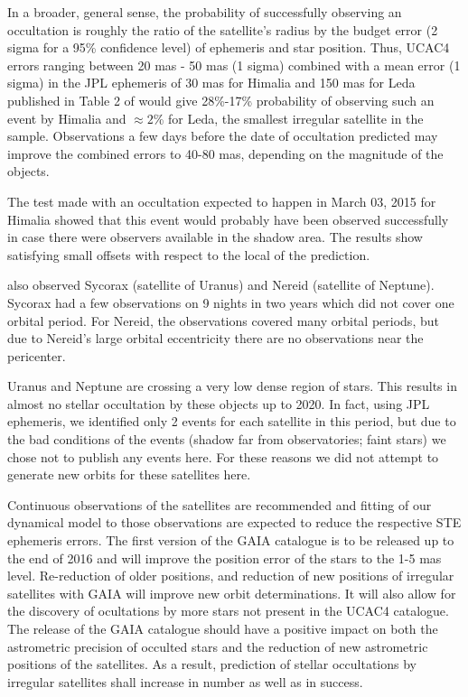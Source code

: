 \documentclass[useAMS,usenatbib]{mn2e}
\begin{document}
In a broader, general sense, the probability of successfully observing an occultation is roughly the ratio of the satellite's radius by the budget error (2 sigma for a 95\% confidence level) of ephemeris and star position. Thus, UCAC4 errors ranging between 20 mas - 50 mas (1 sigma) combined with a mean error (1 sigma) in the JPL ephemeris of 30 mas for Himalia and 150 mas for Leda published in Table 2 of \cite{Jacobson2012} would give 28\%-17\% probability of observing such an event by Himalia and $\approx2$\% for Leda, the smallest irregular satellite in the sample. Observations a few days before the date of occultation predicted may improve the combined errors to 40-80 mas, depending on the magnitude of the objects.

The test made with an occultation expected to happen in March 03, 2015 for Himalia showed that this event would probably have been observed successfully in case there were observers available in the shadow area. The results show satisfying small offsets with respect to the local of the prediction.

\cite{GomesJunior2015} also observed Sycorax (satellite of Uranus) and Nereid (satellite of Neptune). Sycorax had a few observations on 9 nights in two years which did not cover one orbital period. For Nereid, the observations covered many orbital periods, but due to Nereid's large orbital eccentricity there are no observations near the pericenter.

Uranus and Neptune are crossing a very low dense region of stars. This results in almost no stellar occultation by these objects up to 2020. In fact, using JPL ephemeris, we identified only 2 events for each satellite in this period, but due to the bad conditions of the events (shadow far from observatories; faint stars) we chose not to publish any events here.  For these reasons we did not attempt to generate new orbits for these satellites here.

Continuous observations of the satellites are recommended and fitting of our dynamical model to those observations are expected to reduce the respective STE ephemeris errors. The first version of the GAIA catalogue is to be released up to the end of 2016 and will improve the position error of the stars to the 1-5 mas level. Re-reduction of older positions, and reduction of new positions of irregular satellites with GAIA will improve new orbit determinations. It will also allow for the discovery of ocultations by more stars not present in the UCAC4 catalogue.
The release of the GAIA catalogue should have a positive impact on both the astrometric precision of occulted stars and the reduction of new astrometric positions of the satellites. As a result, prediction of stellar occultations by irregular satellites shall increase in number as well as in success.
\end{document}
